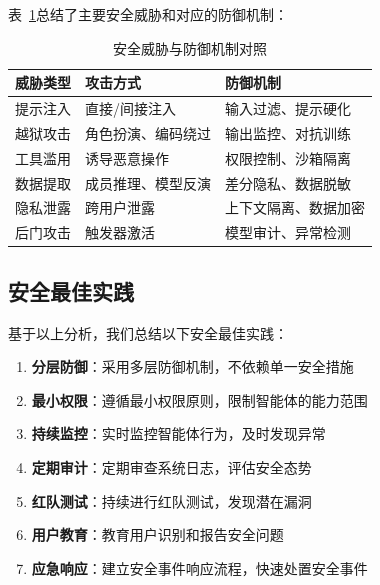 表~\ref{tab:security-summary}总结了主要安全威胁和对应的防御机制：

\begin{table}[htbp]
    \centering
    \caption{安全威胁与防御机制对照}
    \label{tab:security-summary}
    \begin{tabular}{@{}lll@{}}
        \toprule
        \textbf{威胁类型} & \textbf{攻击方式} & \textbf{防御机制} \\
        \midrule
        提示注入 & 直接/间接注入 & 输入过滤、提示硬化 \\
        越狱攻击 & 角色扮演、编码绕过 & 输出监控、对抗训练 \\
        工具滥用 & 诱导恶意操作 & 权限控制、沙箱隔离 \\
        数据提取 & 成员推理、模型反演 & 差分隐私、数据脱敏 \\
        隐私泄露 & 跨用户泄露 & 上下文隔离、数据加密 \\
        后门攻击 & 触发器激活 & 模型审计、异常检测 \\
        \bottomrule
    \end{tabular}
\end{table}

\subsection{安全最佳实践}

基于以上分析，我们总结以下安全最佳实践：

\begin{enumerate}[leftmargin=2em]
    \item \textbf{分层防御}：采用多层防御机制，不依赖单一安全措施
    \item \textbf{最小权限}：遵循最小权限原则，限制智能体的能力范围
    \item \textbf{持续监控}：实时监控智能体行为，及时发现异常
    \item \textbf{定期审计}：定期审查系统日志，评估安全态势
    \item \textbf{红队测试}：持续进行红队测试，发现潜在漏洞
    \item \textbf{用户教育}：教育用户识别和报告安全问题
    \item \textbf{应急响应}：建立安全事件响应流程，快速处置安全事件
\end{enumerate}
